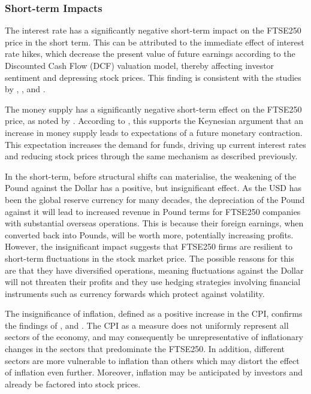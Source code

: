 \documentclass[11pt,a4paper]{article}
\newcommand{\citeboth}[1]{\citeauthor{#1} \citep{#1}}
\begin{document}
\subsubsection{Short-term Impacts}

The interest rate has a significantly
negative short-term impact on the FTSE250 price in the short term. 
This can be attributed to the immediate effect of interest rate hikes, 
which decrease the present value of future earnings according to the 
Discounted Cash Flow (DCF) valuation model, thereby 
affecting investor sentiment and depressing stock prices. 
This finding is consistent with the studies by 
\citeboth{alam2009}, \citeboth{demir2019}, and \citeboth{neifar2023}.

The money supply has a significantly negative short-term effect on the 
FTSE250 price, as noted by \citeboth{olawale2014}. 
According to \citeboth{sellin2001}, this supports the Keynesian argument 
that an increase in money supply leads to expectations of a future 
monetary contraction. This expectation increases the demand for 
funds, driving up current interest rates and reducing stock prices 
through the same mechanism as described previously.

In the short-term, before structural shifts can materialise, the
weakening of the Pound against the Dollar has a positive, but 
insignificant effect. As the USD has been 
the global reserve currency for many decades, the depreciation of the Pound 
against it will lead to increased revenue in Pound terms for FTSE250 
companies with substantial overseas operations. 
This is because their foreign earnings, 
when converted back into Pounds, will be worth more, 
potentially increasing profits. However, the insignificant impact suggests 
that FTSE250 firms are resilient to short-term fluctuations in the stock market 
price. The possible reasons for this are that they have diversified 
operations, meaning fluctuations against the Dollar will not threaten 
their profits and they use hedging strategies involving financial instruments 
such as currency forwards which protect against volatility. 

The insignificance of inflation, defined as a positive 
increase in the CPI, confirms the findings of 
\citeboth{gultekin1983}, \citeboth{firth1979} and \citeboth{neifar2023}. 
The CPI as a measure does not uniformly represent all sectors of the economy, 
and may consequently be unrepresentative of inflationary changes in the 
sectors that predominate the FTSE250. In addition, different sectors 
are more vulnerable to inflation than others which may distort the effect 
of inflation even further. Moreover, inflation may be anticipated 
by investors and already be factored into stock prices.
\end{document}
